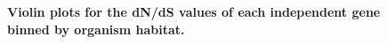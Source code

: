 \documentclass{article}
\begin{document}
\begin{figure}[]
\centering
{}
\caption{\textbf{Violin plots for the dN/dS values of each independent gene binned by organism habitat.}}
\label{fig_7}
\end{figure}
\end{document}
